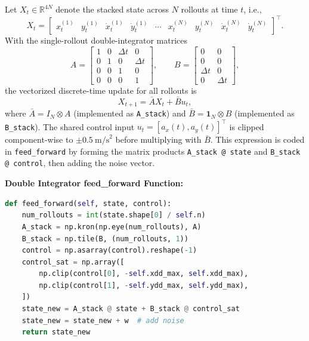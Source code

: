 \documentclass [11pt]{article}
\begin{document}
\begin{enumerate}[label=(\roman*)]
        Let $X_t \in \mathbb{R}^{4N}$ denote the stacked state across $N$ rollouts at time $t$, i.e.,
        \[
            X_t = \begin{bmatrix}x_t^{(1)} & y_t^{(1)} & \dot{x}_t^{(1)} & \dot{y}_t^{(1)} & \cdots & x_t^{(N)} & y_t^{(N)} & \dot{x}_t^{(N)} & \dot{y}_t^{(N)} \end{bmatrix}^\top.
        \]
        With the single-rollout double-integrator matrices
        \[
            A = \begin{bmatrix}
                1 & 0 & \Delta t & 0\\
                0 & 1 & 0 & \Delta t\\
                0 & 0 & 1 & 0\\
                0 & 0 & 0 & 1
            \end{bmatrix},
            \qquad
            B = \begin{bmatrix}
                0 & 0\\
                0 & 0\\
                \Delta t & 0\\
                0 & \Delta t
            \end{bmatrix},
        \]
        the vectorized discrete-time update for all rollouts is
        \begin{equation}
            X_{t+1} = \bar{A} X_t + \bar{B} u_t,
        \end{equation}
        where $\bar{A} = I_N \otimes A$ (implemented as \texttt{A\_stack}) and $\bar{B} = \mathbf{1}_N \otimes B$ (implemented as \texttt{B\_stack}). The shared control input $u_t = [a_x(t), a_y(t)]^\top$ is clipped component-wise to $\pm 0.5~\text{m/s}^2$ before multiplying with $\bar{B}$. This expression is coded in \texttt{feed\_forward} by forming the matrix products \texttt{A\_stack @ state} and \texttt{B\_stack @ control}, then adding the noise vector.

        \textbf{Double Integrator feed\_forward Function:}
\begin{lstlisting}[language=Python]
def feed_forward(self, state, control):
    num_rollouts = int(state.shape[0] / self.n)
    A_stack = np.kron(np.eye(num_rollouts), A)
    B_stack = np.tile(B, (num_rollouts, 1))
    control = np.asarray(control).reshape(-1)
    control_sat = np.array([
        np.clip(control[0], -self.xdd_max, self.xdd_max),
        np.clip(control[1], -self.ydd_max, self.ydd_max),
    ])
    state_new = A_stack @ state + B_stack @ control_sat
    state_new = state_new + w  # add noise
    return state_new
\end{lstlisting}


\end{enumerate}
\end{document}
